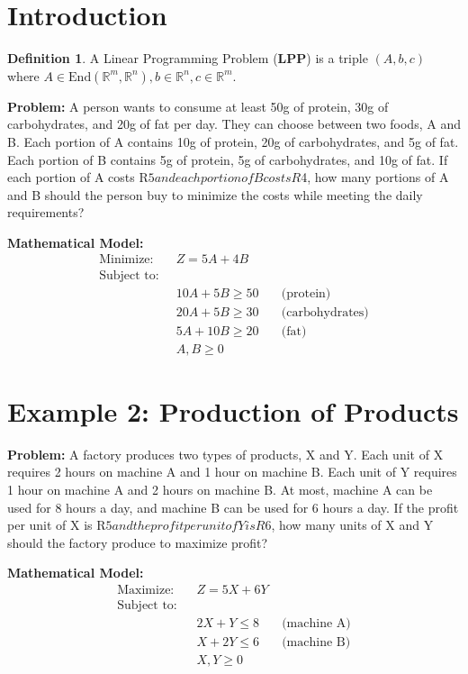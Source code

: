 \documentclass[]{article}
\theoremstyle{definition}
\newtheorem{definition}{Definition}[section]
\theoremstyle{definition}
\newcommand{\bb}{\mathbb}
\begin{document}
\newpage
\newpage






\section{Introduction}

\begin{definition}
	A  Linear Programming Problem (\textbf{LPP}) is a triple $(A, b, c)$ where $A \in \text{End}(\bb{R}^m, \bb{R}^n), b \in \bb{R}^n, c \in \bb{R}^m$.
\end{definition}


\textbf{Problem:}
A person wants to consume at least 50g of protein, 30g of carbohydrates, and 20g of fat per day. They can choose between two foods, A and B. Each portion of A contains 10g of protein, 20g of carbohydrates, and 5g of fat. Each portion of B contains 5g of protein, 5g of carbohydrates, and 10g of fat. If each portion of A costs R$5 and each portion of B costs R$4, how many portions of A and B should the person buy to minimize the costs while meeting the daily requirements?

\textbf{Mathematical Model:}
\begin{align*}
\text{Minimize:} \quad & Z = 5A + 4B \\
\text{Subject to:} \\
& 10A + 5B \geq 50 \quad & \text{(protein)} \\
& 20A + 5B \geq 30 \quad & \text{(carbohydrates)} \\
& 5A + 10B \geq 20 \quad & \text{(fat)} \\
& A, B \geq 0
\end{align*}

\section*{Example 2: Production of Products}

\textbf{Problem:}
A factory produces two types of products, X and Y. Each unit of X requires 2 hours on machine A and 1 hour on machine B. Each unit of Y requires 1 hour on machine A and 2 hours on machine B. At most, machine A can be used for 8 hours a day, and machine B can be used for 6 hours a day. If the profit per unit of X is R$5 and the profit per unit of Y is R$6, how many units of X and Y should the factory produce to maximize profit?

\textbf{Mathematical Model:}
\begin{align*}
\text{Maximize:} \quad & Z = 5X + 6Y \\
\text{Subject to:} \\
& 2X + Y \leq 8 \quad & \text{(machine A)} \\
& X + 2Y \leq 6 \quad & \text{(machine B)} \\
& X, Y \geq 0
\end{align*}
\end{document}

